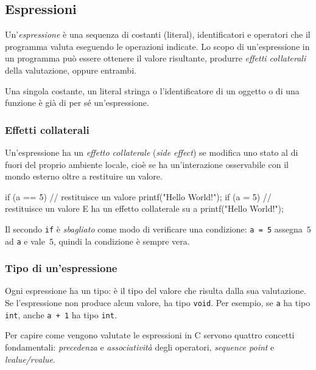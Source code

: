 \documentclass[11pt,a4paper]{article}
\begin{document}
\subsection{Espressioni}

\begin{definizione}
Un'\emph{espressione} è una sequenza di costanti (literal), identificatori e operatori che il programma valuta eseguendo le operazioni indicate. Lo scopo di un'espressione in un programma può essere ottenere il valore risultante, produrre \emph{effetti collaterali} della valutazione, oppure entrambi.
\end{definizione}

Una singola costante, un literal stringa o l'identificatore di un oggetto o di una funzione è già di per sé un'espressione.

\subsubsection{Effetti collaterali}

Un'espressione ha un \emph{effetto collaterale} (\emph{side effect}) se modifica uno stato al di fuori del proprio ambiente locale, cioè se ha un'interazione osservabile con il mondo esterno oltre a restituire un valore.

\begin{codice}
if (a == 5) {              // restituisce un valore
    printf("Hello World!\n");
}
if (a = 5) {               // restituisce un valore E ha un effetto collaterale su a
    printf("Hello World!\n");
}
\end{codice}

\begin{osservazione}
Il secondo \lstinline|if| è \emph{sbagliato} come modo di verificare una condizione: \lstinline|a = 5| assegna~$5$ ad \lstinline|a| e vale~$5$, quindi la condizione è sempre vera.
\end{osservazione}

\subsubsection{Tipo di un'espressione}

Ogni espressione ha un tipo: è il tipo del valore che risulta dalla sua valutazione. Se l'espressione non produce alcun valore, ha tipo \lstinline|void|. Per esempio, se \lstinline|a| ha tipo \lstinline|int|, anche \lstinline|a + 1| ha tipo \lstinline|int|.

Per capire come vengono valutate le espressioni in C servono quattro concetti fondamentali: \emph{precedenza} e \emph{associatività} degli operatori, \emph{sequence point} e \emph{lvalue/rvalue}.
\end{document}
